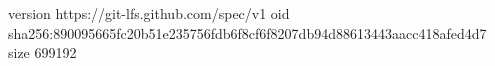 version https://git-lfs.github.com/spec/v1
oid sha256:890095665fc20b51e235756fdb6f8cf6f8207db94d88613443aacc418afed4d7
size 699192
